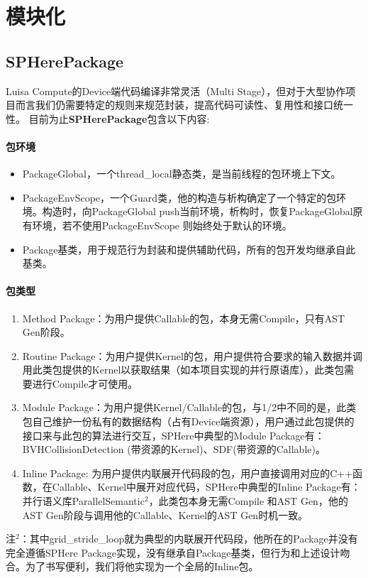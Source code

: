 
\section{模块化}
\subsection{SPHerePackage}
Luisa Compute的Device端代码编译非常灵活（Multi Stage），但对于大型协作项目而言我们仍需要特定的规则来规范封装，提高代码可读性、复用性和接口统一性。
目前为止\textbf{SPHerePackage}包含以下内容:
\paragraph{包环境}
\begin{itemize}
	\item PackageGlobal，一个thread\_local静态类，是当前线程的包环境上下文。
	\item PackageEnvScope，一个Guard类，他的构造与析构确定了一个特定的包环境。构造时，向PackageGlobal push当前环境，析构时，恢复PackageGlobal原有环境，若不使用PackageEnvScope 则始终处于默认的环境。
	\item Package基类，用于规范行为封装和提供辅助代码，所有的包开发均继承自此基类。
\end{itemize}

\paragraph{包类型}
\begin{enumerate}
	\item Method Package：为用户提供Callable的包，本身无需Compile，只有AST Gen阶段。
	\item Routine Package：为用户提供Kernel的包，用户提供符合要求的输入数据并调用此类包提供的Kernel以获取结果（如本项目实现的并行原语库），此类包需要进行Compile才可使用。
	\item Module Package：为用户提供Kernel/Callable的包，与1/2中不同的是，此类包自己维护一份私有的数据结构（占有Device端资源），用户通过此包提供的接口来与此包的算法进行交互，SPHere中典型的Module Package有：BVHCollisionDetection (带资源的Kernel)、SDF(带资源的Callable)。
	\item Inline Package: 为用户提供内联展开代码段的包，用户直接调用对应的C++函数，在Callable、Kernel中展开对应代码，SPHere中典型的Inline Package有：并行语义库ParallelSemantic$^2$，此类包本身无需Compile 和AST Gen，他的AST Gen阶段与调用他的Callable、Kernel的AST Gen时机一致。
\end{enumerate}
注$^2$：其中grid\_stride\_loop就为典型的内联展开代码段，他所在的Package并没有完全遵循SPHere Package实现，没有继承自Package基类，但行为和上述设计吻合。为了书写便利，我们将他实现为一个全局的Inline包。

